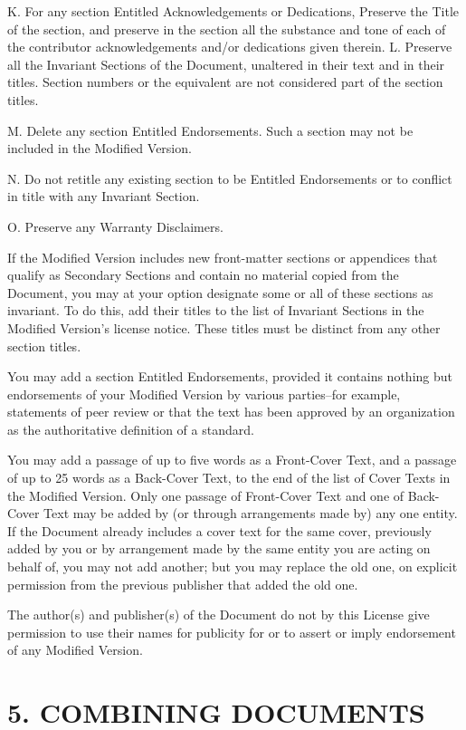 \documentclass[captions=tableheading]{scrbook}
\begin{document}
\begin{example}
K. For any section Entitled Acknowledgements or Dedications, Preserve the Title of the section, and preserve in the section all the substance and tone of each of the contributor acknowledgements and/or dedications given therein. 
L. Preserve all the Invariant Sections of the Document, unaltered in their text and in their titles. Section numbers or the equivalent are not considered part of the section titles. 

M. Delete any section Entitled Endorsements. Such a section may not be included in the Modified Version. 

N. Do not retitle any existing section to be Entitled Endorsements or to conflict in title with any Invariant Section. 

O. Preserve any Warranty Disclaimers.

If the Modified Version includes new front-matter sections or appendices that qualify as Secondary Sections and contain no material copied from the Document, you may at your option designate some or all of these sections as invariant. To do this, add their titles to the list of Invariant Sections in the Modified Version's license notice. These titles must be distinct from any other section titles.

You may add a section Entitled Endorsements, provided it contains nothing but endorsements of your Modified Version by various parties--for example, statements of peer review or that the text has been approved by an organization as the authoritative definition of a standard.

You may add a passage of up to five words as a Front-Cover Text, and a passage of up to 25 words as a Back-Cover Text, to the end of the list of Cover Texts in the Modified Version. Only one passage of Front-Cover Text and one of Back-Cover Text may be added by (or through arrangements made by) any one entity. If the Document already includes a cover text for the same cover, previously added by you or by arrangement made by the same entity you are acting on behalf of, you may not add another; but you may replace the old one, on explicit permission from the previous publisher that added the old one.

The author(s) and publisher(s) of the Document do not by this License give permission to use their names for publicity for or to assert or imply endorsement of any Modified Version.
\section{5. COMBINING DOCUMENTS}
\label{sec-18-6}



\end{example}
\end{document}
